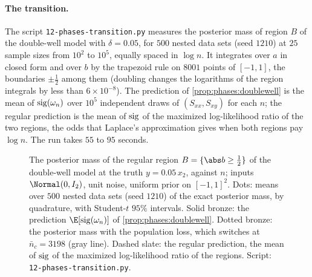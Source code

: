 \begin{refsection}
\paragraph{The transition.} The script \texttt{12-phases-transition.py} measures the posterior mass of region $B$ of the double-well model with $\delta=0.05$, for $500$ nested data sets (seed $1210$) at $25$ sample sizes from $10^2$ to $10^5$, equally spaced in $\log n$. It integrates over $a$ in closed form and over $b$ by the trapezoid rule on $8001$ points of $[-1,1]$, the boundaries $\pm\frac12$ among them (doubling changes the logarithms of the region integrals by less than $6\times10^{-8}$). The prediction of \cref{prop:phases:doublewell} is the mean of $\operatorname{sig}(\omega_n)$ over $10^5$ independent draws of $(S_{xx},S_{xy})$ for each $n$; the regular prediction is the mean of $\operatorname{sig}$ of the maximized log-likelihood ratio of the two regions, the odds that Laplace's approximation gives when both regions pay $\log n$. The run takes $55$ to $95$ seconds.

\begin{figure}[t]
\centering
{}
\caption{The posterior mass of the regular region $B=\{\abs b\ge\frac12\}$ of the double-well model at the truth $y=0.05\,x_2$, against $n$; inputs $\Normal(0,I_2)$, unit noise, uniform prior on $[-1,1]^2$. Dots: means over $500$ nested data sets (seed $1210$) of the exact posterior mass, by quadrature, with Student-$t$ $95\%$ intervals. Solid bronze: the prediction $\E[\phasessig(\omega_n)]$ of \cref{prop:phases:doublewell}. Dotted bronze: the posterior mass with the population loss, which switches at $\bar n_c=3198$ (gray line). Dashed slate: the regular prediction, the mean of $\operatorname{sig}$ of the maximized log-likelihood ratio of the regions. Script: \texttt{12-phases-transition.py}.}\label{fig:phases:transition}
\end{figure}


\end{refsection}
